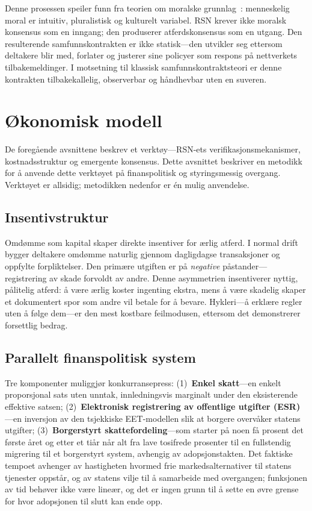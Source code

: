 \documentclass[11pt,a4paper,twocolumn]{article}
\begin{document}
Denne prosessen speiler funn fra teorien om moralske grunnlag~\cite{haidt2012}: menneskelig moral er intuitiv, pluralistisk og kulturelt variabel. RSN krever ikke moralsk konsensus som en inngang; den produserer atferdskonsensus som en utgang. Den resulterende samfunnskontrakten er ikke statisk---den utvikler seg ettersom deltakere blir med, forlater og justerer sine policyer som respons på nettverkets tilbakemeldinger. I motsetning til klassisk samfunnskontraktsteori er denne kontrakten tilbakekallelig, observerbar og håndhevbar uten en suveren.

\section{Økonomisk modell}

De foregående avsnittene beskrev et verktøy---RSN-ets verifikasjonsmekanismer, kostnadsstruktur og emergente konsensus. Dette avsnittet beskriver en metodikk for å anvende dette verktøyet på finanspolitisk og styringsmessig overgang. Verktøyet er allsidig; metodikken nedenfor er én mulig anvendelse.

\subsection{Insentivstruktur}

Omdømme som kapital skaper direkte insentiver for ærlig atferd. I normal drift bygger deltakere omdømme naturlig gjennom dagligdagse transaksjoner og oppfylte forpliktelser. Den primære utgiften er på \emph{negative} påstander---registrering av skade forvoldt av andre. Denne asymmetrien insentiverer nyttig, pålitelig atferd: å være ærlig koster ingenting ekstra, mens å være skadelig skaper et dokumentert spor som andre vil betale for å bevare. Hykleri---å erklære regler uten å følge dem---er den mest kostbare feilmodusen, ettersom det demonstrerer forsettlig bedrag.

\subsection{Parallelt finanspolitisk system}

Tre komponenter muliggjør konkurransepress: (1)~\textbf{Enkel skatt}---en enkelt proporsjonal sats uten unntak, innledningsvis marginalt under den eksisterende effektive satsen; (2)~\textbf{Elektronisk registrering av offentlige utgifter (ESR)}---en inversjon av den tsjekkiske EET-modellen slik at borgere overvåker statens utgifter; (3)~\textbf{Borgerstyrt skattefordeling}---som starter på noen få prosent det første året og etter et tiår når alt fra lave tosifrede prosenter til en fullstendig migrering til et borgerstyrt system, avhengig av adopsjonstakten. Det faktiske tempoet avhenger av hastigheten hvormed frie markedsalternativer til statens tjenester oppstår, og av statens vilje til å samarbeide med overgangen; funksjonen av tid behøver ikke være lineær, og det er ingen grunn til å sette en øvre grense for hvor adopsjonen til slutt kan ende opp.
\end{document}
